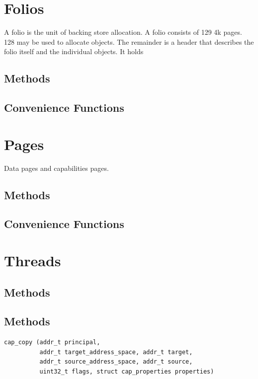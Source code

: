 \clearpage
\section{Folios}

A folio is the unit of backing store allocation.  A folio consists of
129 4k pages.  128 may be used to allocate objects.  The remainder is
a header that describes the folio itself and the individual objects.
It holds

\subsection{Methods}

\subsection{Convenience Functions}

\clearpage
\section{Pages}

Data pages and capabilities pages.

\subsection{Methods}

\subsection{Convenience Functions}

\clearpage
\section{Threads}

\subsection{Methods}

\subsection{Methods}

\begin{lstlisting}
cap_copy (addr_t principal,
          addr_t target_address_space, addr_t target,
          addr_t source_address_space, addr_t source,
          uint32_t flags, struct cap_properties properties)
\end{lstlisting}

